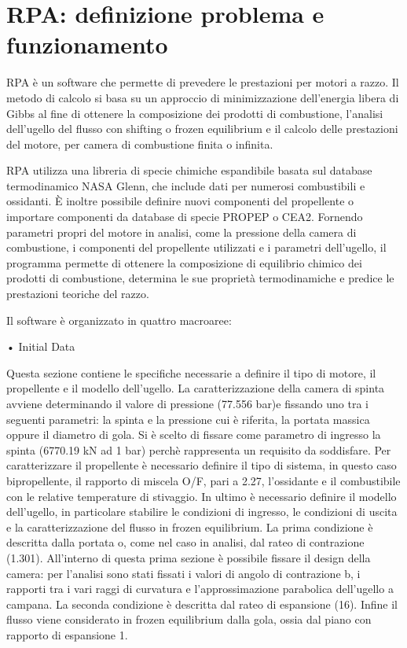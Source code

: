 \section{RPA: definizione problema e funzionamento}
\label{appendix:rpa}
RPA è un software che permette di prevedere le prestazioni per motori a razzo. Il metodo di calcolo si basa su un approccio di minimizzazione dell'energia libera di Gibbs al fine di ottenere la composizione dei prodotti di combustione, l'analisi dell'ugello del flusso con shifting o frozen equilibrium e il calcolo delle prestazioni del motore, per camera di combustione finita o infinita.

RPA utilizza una libreria di specie chimiche espandibile basata sul database termodinamico NASA Glenn, che include dati per numerosi combustibili e ossidanti. È inoltre possibile definire nuovi componenti del propellente o importare componenti da database di specie PROPEP o CEA2.
Fornendo parametri propri del motore in analisi, come la pressione della camera di combustione, i componenti del propellente utilizzati e i parametri dell'ugello, il programma permette di ottenere la composizione di equilibrio chimico dei prodotti di combustione, determina le sue proprietà termodinamiche e predice le prestazioni teoriche del razzo. 

Il software è organizzato in quattro macroaree: 

• Initial Data

Questa sezione contiene le specifiche necessarie a definire il tipo di motore, il propellente e il modello dell'ugello.
La caratterizzazione della camera di spinta avviene determinando il valore di pressione (77.556 bar)e fissando uno tra i seguenti parametri: la spinta e la pressione cui è riferita, la portata massica oppure il diametro di gola. Si è scelto di fissare come parametro di ingresso la spinta (6770.19 kN ad 1 bar) perchè rappresenta un requisito da soddisfare.
Per caratterizzare il propellente è necessario definire il tipo di sistema, in questo caso bipropellente, il rapporto di miscela O/F, pari a 2.27, l'ossidante e il combustibile con le relative temperature di stivaggio. 
In ultimo è necessario definire il modello dell'ugello, in particolare stabilire le condizioni di ingresso, le condizioni di uscita e la caratterizzazione del flusso in frozen equilibrium. La prima condizione è descritta dalla portata o, come nel caso in analisi, dal rateo di contrazione (1.301). All'interno di questa prima sezione è possibile fissare il design della camera: per l'analisi sono stati fissati i valori di angolo di contrazione b, i rapporti tra i vari raggi di curvatura e l'approssimazione parabolica dell'ugello a campana. La seconda condizione è descritta dal rateo di espansione (16). Infine il flusso viene considerato in frozen equilibrium dalla gola, ossia dal piano con rapporto di espansione 1.

